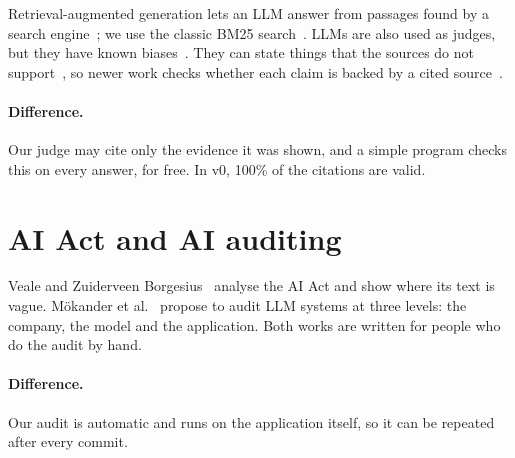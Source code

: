Retrieval-augmented generation lets an LLM answer from passages found by a search engine~\cite{lewis2020rag}; we use the
classic BM25 search~\cite{robertson2009bm25}. LLMs are also used as judges, but they have known biases~\cite{zheng2023judging}.
They can state things that the sources do not support~\cite{ji2023survey}, so newer work checks whether each claim is
backed by a cited source~\cite{gao2023alce}.

\paragraph{Difference.} Our judge may cite only the evidence it was shown, and a simple program checks this on every
answer, for free. In v0, 100\% of the citations are valid.

\section{AI Act and AI auditing}
\label{section:rel-audit}

Veale and Zuiderveen Borgesius~\cite{veale2021demystifying} analyse the AI Act and show where its text is vague.
M\"okander et al.~\cite{mokander2023auditing} propose to audit LLM systems at three levels: the company, the model
and the application. Both works are written for people who do the audit by hand.

\paragraph{Difference.} Our audit is automatic and runs on the application itself, so it can be repeated after every
commit.
